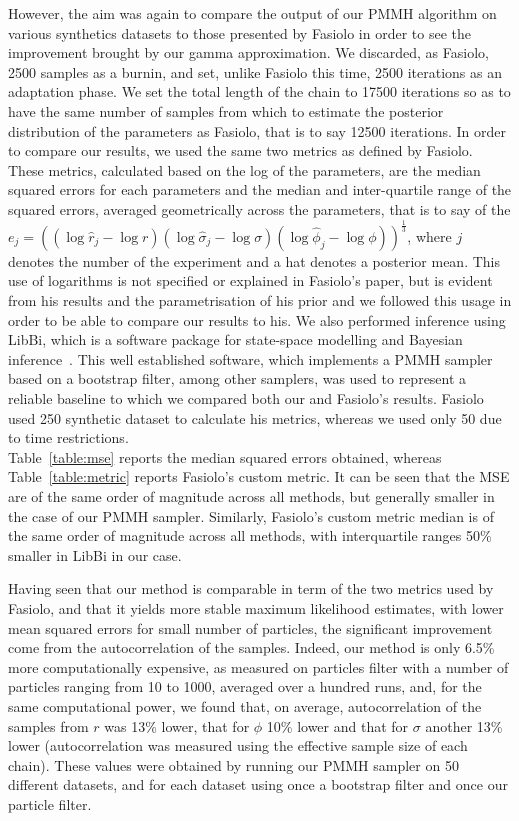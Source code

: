 \documentclass[12pt]{article}
\begin{document}
	However, the aim was again to compare the output of our PMMH algorithm on various synthetics datasets to those presented by Fasiolo in order to see the improvement brought by our gamma approximation. We discarded, as Fasiolo, 2500 samples as a burnin, and set, unlike Fasiolo this time, 2500 iterations as an adaptation phase. We set the total length of the chain to 17500 iterations so as to have the same number of samples from which to estimate the posterior distribution of the parameters as Fasiolo, that is to say 12500 iterations. In order to compare our results, we used the same two metrics as defined by Fasiolo. These metrics, calculated based on the log of the parameters, are the median squared errors for each parameters and the median and inter-quartile range of the squared errors, averaged geometrically across the parameters, that is to say of the $e_j = ((\log\hat{ r}_j-\log r)(\log\hat{\sigma}_j-\log\sigma)(\log\hat{\phi}_j-\log\phi))^\frac{1}{3}$, where $j$ denotes the number of the experiment and a hat denotes a posterior mean. This use of logarithms is not specified or explained in Fasiolo's paper, but is evident from his results and the parametrisation of his prior and we followed this usage in order to be able to compare our results to his. We also performed inference using LibBi, which is a software package for state-space modelling and Bayesian inference~\cite{murray2013bayesian}. This well established software, which implements a PMMH sampler based on a bootstrap filter, among other samplers, was used to represent a reliable baseline to which we compared both our and Fasiolo's results. Fasiolo used 250 synthetic dataset to calculate his metrics, whereas we used only 50 due to time restrictions. \\
	Table~\ref{table:mse} reports the median squared errors obtained, whereas Table~\ref{table:metric} reports Fasiolo's custom metric. It can be seen that the MSE are of the same order of magnitude across all methods, but generally smaller in the case of our PMMH sampler. Similarly, Fasiolo's custom metric median is of the same order of magnitude across all methods, with interquartile ranges 50\% smaller in LibBi in our case.
	
	Having seen that our method is comparable in term of the two metrics used by Fasiolo, and that it yields more stable maximum likelihood estimates, with lower mean squared errors for small number of particles, the significant improvement come from the autocorrelation of the samples. Indeed, our method is only 6.5\% more computationally expensive, as measured on particles filter with a number of particles ranging from 10 to 1000, averaged over a hundred runs, and, for the same computational power, we found that, on average, autocorrelation of the samples from $r$ was 13\% lower, that for $\phi$ 10\% lower and that for $\sigma$ another 13\% lower (autocorrelation was measured using the effective sample size of each chain). These values were obtained by running our PMMH sampler on 50 different datasets, and for each dataset using once a bootstrap filter and once our particle filter.
	
\end{document}
